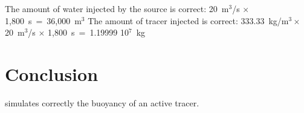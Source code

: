 The amount of water injected by the source is correct: 20~m$^3$/s $\times$ 1,800~s~=~36,000~m$^3$
The amount of tracer injected is correct:
333.33~kg/m$^3 \times $20~m$^3$/s $\times$ 1,800~s~=~1.19999 10$^7$~kg
%
\section{Conclusion}
%
 simulates correctly the buoyancy of an active tracer.
%
%
